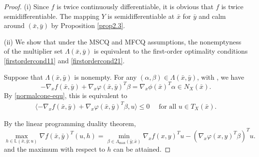 \documentclass[11pt]{article}
\numberwithin{equation}{section}
\begin{document}
{\begin{proof}

 (i) Since $f$ is twice continuously differentiable, it is obvious that $f$ is twice semidifferentiable. The mapping $Y$ is semidifferentiable at $\bar x$ for $\bar y$ and calm around $(\bar x,\bar y)$ by Proposition \ref{prop2.3}.

 (ii) We show that under the MSCQ and MFCQ assumptions, the nonemptyness of the multiplier set $\Lambda(\bar x,\bar y)$ is equivalent to the first-order optimality conditions \eqref{firstordercond11} and \eqref{firstordercond21}.


Suppose that $\Lambda(\bar x,\bar y)$ is nonempty. For any $(\alpha,\beta) \in \Lambda(\bar x,\bar y)$, with \cite[Proposition 4.2]{ABM21}, we have  
\begin{equation}\label{xnormal}
	-\nabla_x f(\bar x,\bar y)+\nabla_x \varphi(\bar x,\bar y)^T\beta=\nabla_x \phi(\bar x)^T\alpha \in N_{X}(\bar x).
	\end{equation}
By \eqref{normalcone-equ}, this is equivalent to 
\begin{align} \langle -\nabla_x f(\bar x,\bar y)+\nabla_x \varphi(\bar x,\bar y)^T\beta,u \rangle \leq 0 \quad  \text { for all } u \in T_{ X}(\bar x). \label{u2}
   \end{align}

By the linear programming duality theorem,
\begin{equation}\label{strongdua} \max\limits_{h \in \mathbb{L}(\bar x,\bar y;u)} \nabla f(\bar x,\bar y)^T(u,h) = \min\limits_{\beta \in \Lambda_{\max}(\bar y; \bar x)} \nabla_x f(x,y)^Tu - (\nabla_x \varphi(x,y)^T\beta) ^Tu.
	\end{equation}
and the maximum with respect to $h$ can be attained.


\end{proof}}
\end{document}
